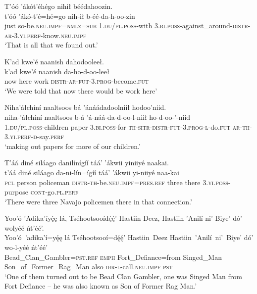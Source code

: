 \ea\label{ex:text1-28-6}
T’óó ’ákót’éhégo nihił béédahoozin.\\
\gll t’óó	’ákó-t’é=hé=go	nih-ił	b-éé-da-h-oo-zin\\
     just	so-be.\textsc{neu}.\textsc{impf}=\textsc{nmlz}=\textsc{sub}	1.\textsc{du}/\textsc{pl}.\textsc{poss}-with	3.\textsc{bi}.\textsc{poss}-against\_around-\textsc{distr}-\textsc{ar}-3.\textsc{yi}.\textsc{perf}-know.\textsc{neu}.\textsc{impf}\\
\glt `That is all that we found out.'
\z

\ea\label{ex:text1-29-1}
K’ad kwe’é naanish dahodooleeł.\\
\gll k’ad	kwe’é	naanish	da-ho-d-oo-leeł\\
     now	here	work	\textsc{distr}-\textsc{ar}-\textsc{fut}-3.\textsc{prog}-become.\textsc{fut}\\
\glt `We were told that now there would be work here'
\z

\ea\label{ex:text1-29-2}
Niha’áłchíní naaltsoos bá ’ánáádadoolniił hodoo’niid.\\
\gll niha-’áłchíní	naaltsoos	b-á	’á-náá-da-d-oo-l-niił	ho-d-oo-’-niid\\
     1.\textsc{du}/\textsc{pl}.\textsc{poss}-children	paper	3.\textsc{bi}.\textsc{poss}-for	\textsc{th}-\textsc{sitr}-\textsc{distr}-\textsc{fut}-3.\textsc{prog}-\textsc{l}-do.\textsc{fut}	\textsc{ar}-\textsc{th}-3.\textsc{yi}.\textsc{perf}-\textsc{d}-say.\textsc{perf}\\
\glt `making out papers for more of our children.'
\z

\ea\label{ex:text1-29-3}
T’áá diné siláago danilínígíí táá’ ’ákwii yiniiyé naakai.\\
\gll t’áá	diné	siláago	da-ni-lín=ígíí	táá’	’ákwii	yi-niiyé	naa-kai\\
     \textsc{pcl}	person	policeman	\textsc{distr}-\textsc{th}-be.\textsc{neu}.\textsc{impf}=\textsc{pres}.\textsc{ref}	three	there	3.\textsc{yi}.\textsc{poss}-purpose	\textsc{cont}-go.\textsc{pl}.\textsc{perf}\\
\glt `There were three Navajo policemen there in that connection.'
\z

\newpage
\ea\label{ex:text1-29-4}
Yoo’ó ’Adika’íyę́ę lá, Tséhootsooídę́ę́’ Hastiin Deez, Hastiin ’Anilí ni’ Biye’ dó’ wolyéé ńt’éé’.\\
\gll Yoo’ó~{’adika’í=yę́ę}	lá	Tséhootsooí=dę́ę́’	Hastiin~{Deez}	Hastiin~’Anilí~ni’~{Biye’}	dó’	wo-l-yéé	ńt’éé’\\
     Bead\_Clan\_Gambler=\textsc{pst}.\textsc{ref}	\textsc{emph}	Fort\_Defiance=from	Singed\_Man	Son\_of\_Former\_Rag\_Man	also	\textsc{dir}-\textsc{l}-call.\textsc{neu}.\textsc{impf}	\textsc{pst}\\
\glt `One of them turned out to be Bead Clan Gambler, one was Singed Man from Fort Defiance -- he was also known as Son of Former Rag Man.'
\z

